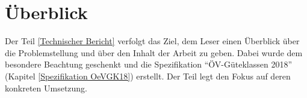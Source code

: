 
\section{Überblick}
\label{Überblick}

Der Teil \ref{Technischer Bericht}  verfolgt das Ziel, dem Leser einen Überblick über die Problemstellung und über den Inhalt der Arbeit zu geben.
Dabei wurde dem  besondere Beachtung geschenkt und die Spezifikation "`\gls{ÖV-Güteklassen} 2018"' (Kapitel \ref{Spezifikation OeVGK18}) erstellt.
Der Teil  legt den Fokus auf deren konkreten Umsetzung.